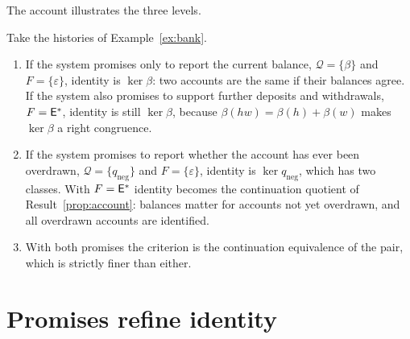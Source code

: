 The account illustrates the three levels.

\begin{example}\label{ex:identity-accounts}
Take the histories of Example~\ref{ex:bank}.
\begin{enumerate}[nosep,label=(\roman*)]
  \item If the system promises only to report the current balance, $\mathcal Q=\{\beta\}$ and $F=\{\varepsilon\}$, identity is $\ker\beta$: two accounts are the same if their balances agree. If the system also promises to support further deposits and withdrawals, $F=\mathsf{E}^{*}$, identity is still $\ker\beta$, because $\beta(hw)=\beta(h)+\beta(w)$ makes $\ker\beta$ a right congruence.
  \item If the system promises to report whether the account has ever been overdrawn, $\mathcal Q=\{q_{\mathrm{neg}}\}$ and $F=\{\varepsilon\}$, identity is $\ker q_{\mathrm{neg}}$, which has two classes. With $F=\mathsf{E}^{*}$ identity becomes the continuation quotient of Result~\ref{prop:account}: balances matter for accounts not yet overdrawn, and all overdrawn accounts are identified.
  \item With both promises the criterion is the continuation equivalence of the pair, which is strictly finer than either.
\end{enumerate}
\end{example}

\section{Promises refine identity}


